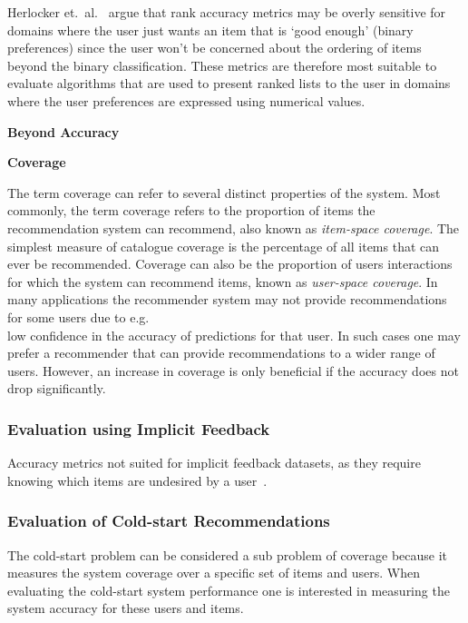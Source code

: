 Herlocker et.\ al.~\cite{Herlocker2004} argue that rank accuracy metrics may be
overly sensitive for domains where the user just wants an item that is `good
enough' (binary preferences) since the user won't be concerned about the
ordering of items beyond the binary classification. These metrics are therefore
most suitable to evaluate algorithms that are used to present ranked lists to
the user in domains where the user preferences are expressed using numerical
values.

\textbf{Beyond Accuracy}

\textbf{Coverage}

The term coverage can refer to several distinct properties of the system. Most
commonly, the term coverage refers to the proportion of items the
recommendation system can recommend, also known as \emph{item-space coverage}.
The simplest measure of catalogue coverage is the percentage of all items that
can ever be recommended. Coverage can also be the proportion of users
interactions for which the system can recommend items, known as
\emph{user-space coverage}. In many applications the recommender system may not
provide recommendations for some users due to e.g.\\ low confidence in the
accuracy of predictions for that user. In such cases one may prefer a
recommender that can provide recommendations to a wider range of users. However, an increase in coverage is only beneficial if the accuracy does not drop significantly.


\subsubsection{Evaluation using Implicit Feedback}

Accuracy metrics not suited for implicit feedback datasets, as they require
knowing which items are undesired by a user~\cite{Hu2008}.


\subsubsection{Evaluation of Cold-start Recommendations}

The cold-start problem can be considered a sub problem of coverage because it
measures the system coverage over a specific set of items and users. When
evaluating the cold-start system performance one is interested in measuring the
system accuracy for these users and items.

